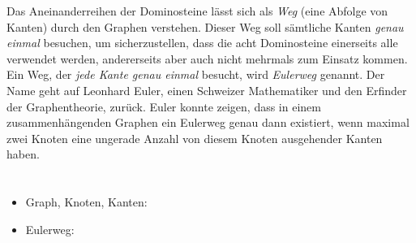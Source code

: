 {{Das Aneinanderreihen der Dominosteine lässt sich als \emph{Weg} (eine Abfolge von Kanten) durch den Graphen verstehen. Dieser Weg soll sämtliche Kanten \emph{genau einmal} besuchen, um sicherzustellen, dass die acht Dominosteine einerseits alle verwendet werden, andererseits aber auch nicht mehrmals zum Einsatz kommen.  Ein Weg, der \emph{jede  Kante genau einmal} besucht, wird \emph{Eulerweg} genannt. Der Name geht auf Leonhard Euler, einen Schweizer Mathematiker und den Erfinder der Graphentheorie, zurück. Euler konnte zeigen, dass in einem zusammenhängenden Graphen ein Eulerweg genau dann existiert, wenn maximal zwei Knoten eine ungerade Anzahl von diesem Knoten ausgehender Kanten haben.



\section*{\BrochureWebsitesAndKeywords}
{\raggedright
\begin{itemize}
  \item Graph, Knoten, Kanten: \href{https://de.wikipedia.org/wiki/Graph_(Graphentheorie)}{}
  \item Eulerweg: \href{https://de.wikipedia.org/wiki/Eulerkreisproblem}{}
\end{itemize}


}

}{}

\def\AuthorStaubJ{} %
\def\AuthorChothiaZ{} %
\def\AuthorDatzkoThutS{} %
\def\AuthorEscherleN{} %
\def\AuthorPohlW{} %

\newpage}{}
